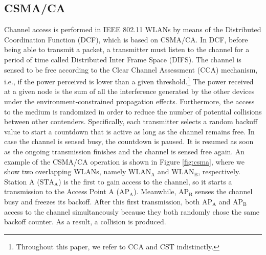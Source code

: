 \documentclass[preprint,12pt]{elsarticle}
\begin{document}
\subsection{CSMA/CA}
\label{section:csma}	
Channel access is performed in IEEE 802.11 WLANs by means of the Distributed Coordination Function (DCF), which is based on CSMA/CA. In DCF, before being able to transmit a packet, a transmitter must listen to the channel for a period of time called Distributed Inter Frame Space (DIFS). The channel is sensed to be free according to the Clear Channel Assessment (CCA) mechanism, i.e., if the power perceived is lower than a given threshold.\footnote{Throughout this paper, we refer to CCA and CST indistinctly.} The power received at a given node is the sum of all the interference generated by the other devices under the environment-constrained propagation effects. Furthermore, the access to the medium is randomized in order to reduce the number of potential collisions between other contenders. Specifically, each transmitter selects a random backoff value to start a countdown that is active as long as the channel remains free. In case the channel is sensed busy, the countdown is paused. It is resumed as soon as the ongoing transmission finishes and the channel is sensed free again. An example of the CSMA/CA operation is shown in Figure \ref{fig:csma}, where we show two overlapping WLANs, namely $\text{WLAN}_{\text{A}}$ and $\text{WLAN}_{\text{B}}$, respectively. Station A ($\text{STA}_{\text{A}}$) is the first to gain access to the channel, so it starts a transmission to the Access Point A ($\text{AP}_\text{A}$). Meanwhile, $\text{AP}_{\text{B}}$ senses the channel busy and freezes its backoff. After this first transmission, both $\text{AP}_{\text{A}}$ and $\text{AP}_{\text{B}}$ access to the channel simultaneously because they both randomly chose the same backoff counter. As a result, a collision is produced.
\end{document}
